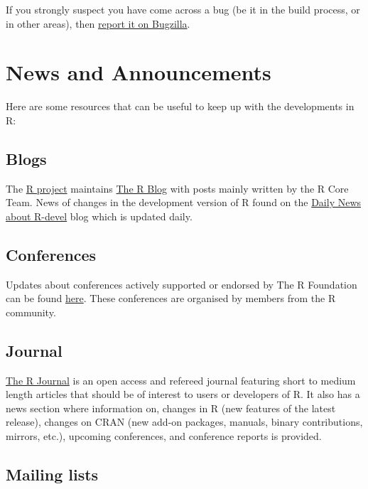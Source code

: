\documentclass[
  letterpaper,
  DIV=11,
  numbers=noendperiod]{scrreprt}
\begin{document}
If you strongly suspect you have come across a bug (be it in the build
process, or in other areas), then \hyperref[ReportBug]{report it on
Bugzilla}.


\chapter{News and Announcements}\label{News}

Here are some resources that can be useful to keep up with the
developments in R:

\section{Blogs}\label{blogs}

The \href{https://www.r-project.org/}{R project} maintains
\href{https://blog.r-project.org/}{The R Blog} with posts mainly written
by the R Core Team. News of changes in the development version of R
found on the
\href{https://developer.r-project.org/blosxom.cgi/R-devel}{Daily News
about R-devel} blog which is updated daily.

\section{Conferences}\label{conferences}

Updates about conferences actively supported or endorsed by The R
Foundation can be found
\href{https://www.r-project.org/conferences/}{here}. These conferences
are organised by members from the R community.

\section{Journal}\label{journal}

\href{https://journal.r-project.org/}{The R Journal} is an open access
and refereed journal featuring short to medium length articles that
should be of interest to users or developers of R. It also has a news
section where information on, changes in R (new features of the latest
release), changes on CRAN (new add-on packages, manuals, binary
contributions, mirrors, etc.), upcoming conferences, and conference
reports is provided.

\section{Mailing lists}\label{mailing-lists-1}
\end{document}
